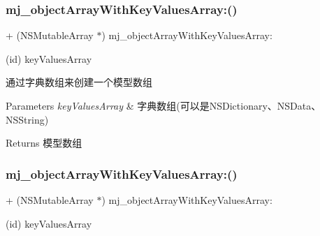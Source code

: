\subsubsection{\texorpdfstring{mj\+\_\+object\+Array\+With\+Key\+Values\+Array\+:()}{mj\_objectArrayWithKeyValuesArray:()}\hspace{0.1cm}{\footnotesize\ttfamily [2/3]}}
{\footnotesize\ttfamily + (N\+S\+Mutable\+Array $\ast$) mj\+\_\+object\+Array\+With\+Key\+Values\+Array\+: \begin{DoxyParamCaption}\item[{(id)}]{key\+Values\+Array }\end{DoxyParamCaption}}

通过字典数组来创建一个模型数组 
\begin{DoxyParams}{Parameters}
{\em key\+Values\+Array} & 字典数组(可以是\+N\+S\+Dictionary、\+N\+S\+Data、\+N\+S\+String) \\
\hline
\end{DoxyParams}
\begin{DoxyReturn}{Returns}
模型数组 
\end{DoxyReturn}
\mbox{\label{category_n_s_object_07_m_j_key_value_08_a4bbc4da54fe5f2fddc993aad366ff617}} 
\subsubsection{\texorpdfstring{mj\+\_\+object\+Array\+With\+Key\+Values\+Array\+:()}{mj\_objectArrayWithKeyValuesArray:()}\hspace{0.1cm}{\footnotesize\ttfamily [3/3]}}
{\footnotesize\ttfamily + (N\+S\+Mutable\+Array $\ast$) mj\+\_\+object\+Array\+With\+Key\+Values\+Array\+: \begin{DoxyParamCaption}\item[{(id)}]{key\+Values\+Array }\end{DoxyParamCaption}}


